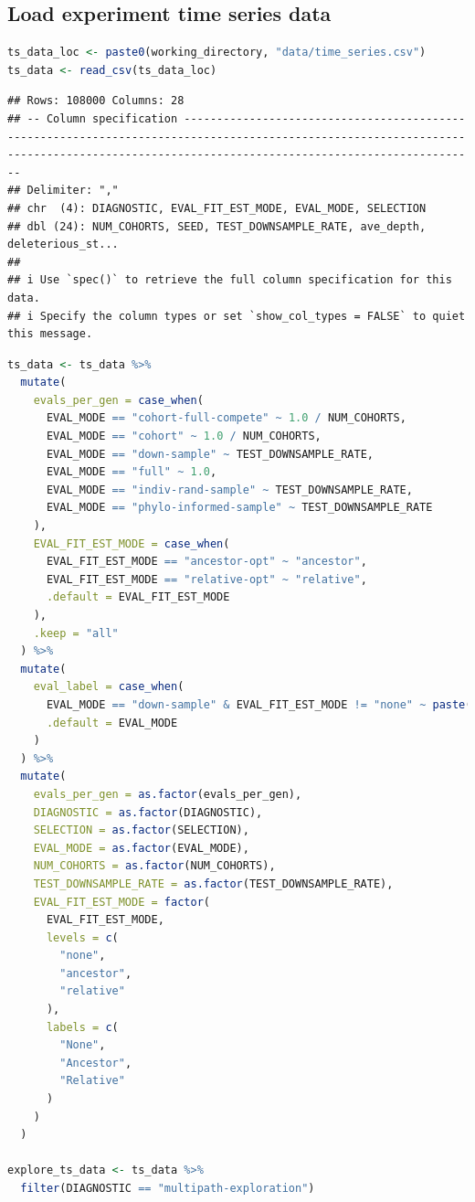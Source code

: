 \documentclass[
]{book}
\begin{document}
\hypertarget{load-experiment-time-series-data-2}{%
\subsection{Load experiment time series data}\label{load-experiment-time-series-data-2}}

\begin{lstlisting}[language=R]
ts_data_loc <- paste0(working_directory, "data/time_series.csv")
ts_data <- read_csv(ts_data_loc)
\end{lstlisting}

\begin{lstlisting}
## Rows: 108000 Columns: 28
## -- Column specification -----------------------------------------------------------------------------------------------------------------------------------------------------------------------------------------
## Delimiter: ","
## chr  (4): DIAGNOSTIC, EVAL_FIT_EST_MODE, EVAL_MODE, SELECTION
## dbl (24): NUM_COHORTS, SEED, TEST_DOWNSAMPLE_RATE, ave_depth, deleterious_st...
## 
## i Use `spec()` to retrieve the full column specification for this data.
## i Specify the column types or set `show_col_types = FALSE` to quiet this message.
\end{lstlisting}

\begin{lstlisting}[language=R]
ts_data <- ts_data %>%
  mutate(
    evals_per_gen = case_when(
      EVAL_MODE == "cohort-full-compete" ~ 1.0 / NUM_COHORTS,
      EVAL_MODE == "cohort" ~ 1.0 / NUM_COHORTS,
      EVAL_MODE == "down-sample" ~ TEST_DOWNSAMPLE_RATE,
      EVAL_MODE == "full" ~ 1.0,
      EVAL_MODE == "indiv-rand-sample" ~ TEST_DOWNSAMPLE_RATE,
      EVAL_MODE == "phylo-informed-sample" ~ TEST_DOWNSAMPLE_RATE
    ),
    EVAL_FIT_EST_MODE = case_when(
      EVAL_FIT_EST_MODE == "ancestor-opt" ~ "ancestor",
      EVAL_FIT_EST_MODE == "relative-opt" ~ "relative",
      .default = EVAL_FIT_EST_MODE
    ),
    .keep = "all"
  ) %>%
  mutate(
    eval_label = case_when(
      EVAL_MODE == "down-sample" & EVAL_FIT_EST_MODE != "none" ~ paste("down-sample", EVAL_FIT_EST_MODE, sep="-"),
      .default = EVAL_MODE
    )
  ) %>%
  mutate(
    evals_per_gen = as.factor(evals_per_gen),
    DIAGNOSTIC = as.factor(DIAGNOSTIC),
    SELECTION = as.factor(SELECTION),
    EVAL_MODE = as.factor(EVAL_MODE),
    NUM_COHORTS = as.factor(NUM_COHORTS),
    TEST_DOWNSAMPLE_RATE = as.factor(TEST_DOWNSAMPLE_RATE),
    EVAL_FIT_EST_MODE = factor(
      EVAL_FIT_EST_MODE,
      levels = c(
        "none",
        "ancestor",
        "relative"
      ),
      labels = c(
        "None",
        "Ancestor",
        "Relative"
      )
    )
  )

explore_ts_data <- ts_data %>%
  filter(DIAGNOSTIC == "multipath-exploration")
\end{lstlisting}
\end{document}
